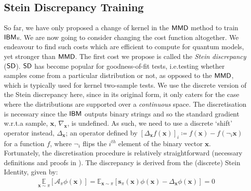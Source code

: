 \subsection*{Stein Discrepancy Training}\label{ssec:steintrainingofibm}
So far, we have only proposed a change of kernel in the $\operatorname{\textsf{MMD}}$ method to train 
$\textsf{IBM}$s. We are now going to consider changing the cost function altogether. We endeavour to find such costs which are efficient to compute for quantum models, yet stronger than $\operatorname{\textsf{MMD}}$. 
The first cost we propose is called the \textit{Stein discrepancy} ($\operatorname{\textsf{SD}}$). $\operatorname{\textsf{SD}}$ has become popular for goodness-of-fit tests\cite{liu_kernelized_2016}, i.e.\@ testing whether samples come from a particular distribution or not, as opposed to the $\operatorname{\textsf{MMD}}$, which is typically used for kernel two-sample tests\cite{gretton_kernel_2007}. 
We use the discrete version of the Stein discrepancy\cite{yang_goodness--fit_2018} here, since in its original form\cite{liu_kernelized_2016}, it only caters for the case where the distributions are supported over a \textit{continuous} space. The discretisation is necessary since the $\textsf{IBM}$ outputs binary strings and so the standard gradient w.r.t.\@ a sample, $\mathbf{x}$, $\nabla_{\mathbf{x}}$, is undefined. As such, we need to use a discrete `shift' operator instead, $\Delta_{\mathbf{x}}$; an operator defined by $[\Delta_\mathbf{x}f(\mathbf{x})]_i \coloneqq f(\mathbf{x}) - f(\neg_i\mathbf{x})$ for a function $f$,
where $\neg_i$ flips the $i^{th}$ element of the binary vector $\mathbf{x}$. Fortunately, the discretisation procedure is relatively straightforward (necessary definitions and proofs in ).
The discrepancy is derived\cite{liu_kernelized_2016, gorham_measuring_2015} from the (discrete) Stein Identity\cite{yang_goodness--fit_2018}, given by:
\begin{align}
    \underset{\mathbf{x}\sim \pi}{\mathbb{E}}[\mathcal{A}_\pi \phi(\mathbf{x})]= \mathbb{E}_{\mathbf{x} \sim \pi}\left[\mathbf{s}_\pi(\mathbf{x})\phi(\mathbf{x}) - \Delta_{\mathbf{x}} \phi(\mathbf{x})\right] = 0 
    \label{complexdiscretesteinidentity}
\end{align}

